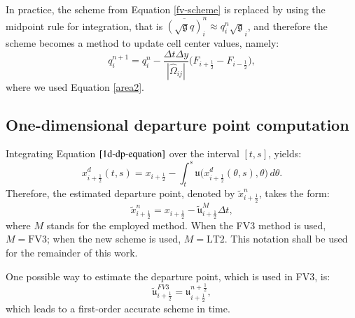 \documentclass[preprint,12pt]{elsarticle}
\begin{document}
\begin{linenumbers}
In practice, the scheme from Equation \eqref{fv-scheme} is replaced by using the midpoint rule for integration, that is $\overline{(\sqrt{\mathfrak{g}}q)}_{i}^n \approx q_{i}^n\sqrt{\mathfrak{g}}_{i}$, and therefore the scheme becomes a method to update cell center values, namely:
\begin{equation}
	\label{fv-scheme-mdp}
	{q}^{n+1}_{i} = {q}^{n}_{i} - \frac{\Delta t \Delta y}{|\hat{\Omega}_{ij}|}
	\bigg({F}_{i+\frac{1}{2}}-
	{F}_{i-\frac{1}{2}}\bigg),
\end{equation}
where we used Equation \eqref{area2}.

\subsection{One-dimensional departure point computation}
Integrating Equation $\eqref{1d-dp-equation}$ over the interval $[t,s]$, yields:
\begin{equation}
	\label{dp-integral}
	x_{i+\frac{1}{2}}^d(t,s) = x_{i+\frac{1}{2}} - \int_{t}^{s}{\mathfrak{u}}\big( x_{i+\frac{1}{2}}^d(\theta,s), \theta\big) \,d\theta.
\end{equation}
Therefore, the estimated departure point, denoted by $\tilde{x}_{i+\frac{1}{2}}^n$, takes the form:
\begin{equation}
	\label{dp-estimated}
	\tilde{x}_{i+\frac{1}{2}}^n = x_{i+\frac{1}{2}} - {\tilde{\mathfrak{u}}}^{M}_{i+\frac{1}{2}}\Delta t,
\end{equation}
where $M$ stands for the employed method.
When the FV3 method is used, $M=\text{FV3}$; when the new scheme is used, $M=\text{LT2}$. This notation shall be used for the remainder of this work.

One possible way to estimate the departure point, which is used in FV3, is:
\begin{equation}
	\label{dp-fv3}
	\tilde{\mathfrak{u}}^{FV3}_{i+\frac{1}{2}} = \mathfrak{u}^{n+\frac{1}{2}}_{i+\frac{1}{2}},
\end{equation}
which leads to a first-order accurate scheme in time.


\end{linenumbers}
\end{document}
